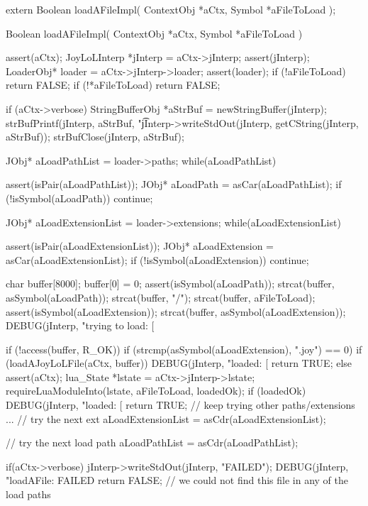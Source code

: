\startCHeader
extern Boolean loadAFileImpl(
  ContextObj *aCtx,
  Symbol     *aFileToLoad
);
\stopCHeader
{}

\startCCode
Boolean loadAFileImpl(
  ContextObj *aCtx,
  Symbol     *aFileToLoad
) {
  assert(aCtx);
  JoyLoLInterp *jInterp = aCtx->jInterp;
  assert(jInterp);
  LoaderObj* loader = aCtx->jInterp->loader;
  assert(loader);
  if (!aFileToLoad) return FALSE;
  if (!*aFileToLoad) return FALSE;

  if (aCtx->verbose) {
    StringBufferObj *aStrBuf = 
      newStringBuffer(jInterp);
    strBufPrintf(jInterp, aStrBuf, "\t%
    jInterp->writeStdOut(jInterp, getCString(jInterp, aStrBuf));
    strBufClose(jInterp, aStrBuf);
  }

  JObj* aLoadPathList = loader->paths;
  while(aLoadPathList) {
    assert(isPair(aLoadPathList));
    JObj* aLoadPath = asCar(aLoadPathList);
    if (!isSymbol(aLoadPath)) continue;

    JObj* aLoadExtensionList = loader->extensions;
    while(aLoadExtensionList) {
      assert(isPair(aLoadExtensionList));
      JObj* aLoadExtension = asCar(aLoadExtensionList);
      if (!isSymbol(aLoadExtension)) continue;

      char buffer[8000];
      buffer[0] = 0;
      assert(isSymbol(aLoadPath));
      strcat(buffer, asSymbol(aLoadPath));
      strcat(buffer, "/");
      strcat(buffer, aFileToLoad);
      assert(isSymbol(aLoadExtension));
      strcat(buffer, asSymbol(aLoadExtension));
      DEBUG(jInterp, "trying to load: [%

      if (!access(buffer, R_OK)) {
        if (strcmp(asSymbol(aLoadExtension), ".joy") == 0) {
          if (loadAJoyLoLFile(aCtx, buffer)) {
            DEBUG(jInterp, "loaded: [%
            return TRUE;
          }
        } else {
          assert(aCtx);
          lua_State *lstate = aCtx->jInterp->lstate;
          requireLuaModuleInto(lstate, aFileToLoad, loadedOk);
          if (loadedOk) {
            DEBUG(jInterp, "loaded: [%
            return TRUE;
          }
        }
        // keep trying other paths/extensions ...
      }
      // try the next ext
      aLoadExtensionList = asCdr(aLoadExtensionList);
    }
    // try the next load path
    aLoadPathList = asCdr(aLoadPathList);
  }
  if(aCtx->verbose) {
    jInterp->writeStdOut(jInterp, "FAILED\n");
  }
  DEBUG(jInterp, "loadAFile: FAILED%
  return FALSE; // we could not find this file in any of the load paths
}
\stopCCode

